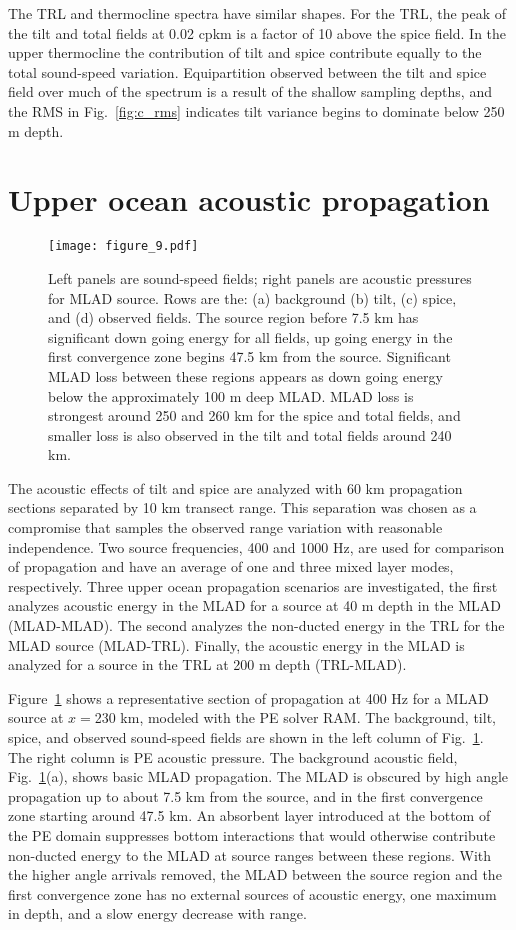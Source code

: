 \documentclass[preprint,NumberedRefs]{JASA}
\begin{document}
The TRL and thermocline spectra have similar shapes. For the TRL, the peak of the tilt and total fields at 0.02 cpkm is a factor of 10 above the spice field. In the upper thermocline the contribution of tilt and spice contribute equally to the total sound-speed variation. Equipartition observed between the tilt and spice field over much of the spectrum is a result of the shallow sampling depths, and the RMS in Fig.~\ref{fig:c_rms} indicates tilt variance begins to dominate below 250 m depth.

\section{\label{sec:propagation}Upper ocean acoustic propagation}
\begin{figure}
\texttt{[image: figure\_9.pdf]}
    \caption{\label{fig:decomp_x}{Left panels are sound-speed fields; right panels are acoustic pressures for MLAD source. Rows are the: (a) background (b) tilt, (c) spice, and (d) observed fields. The source region before 7.5 km has significant down going energy for all fields, up going energy in the first convergence zone begins 47.5 km from the source. Significant MLAD loss between these regions appears as down going energy below the approximately 100 m deep MLAD. MLAD loss is strongest around 250 and 260 km for the spice and total fields, and smaller loss is also observed in the tilt and total fields around 240 km.}}
\end{figure}

The acoustic effects of tilt and spice are analyzed with 60 km propagation sections separated by 10 km transect range. This separation was chosen as a compromise that samples the observed range variation with reasonable independence. Two source frequencies, 400 and 1000 Hz, are used for comparison of propagation and have an average of one and three mixed layer modes, respectively. Three upper ocean propagation scenarios are investigated, the first analyzes acoustic energy in the MLAD for a source at 40 m depth in the MLAD (MLAD-MLAD). The second analyzes the non-ducted energy in the TRL for the MLAD source (MLAD-TRL). Finally, the acoustic energy in the MLAD is analyzed for a source in the TRL at 200 m depth (TRL-MLAD).

Figure~\ref{fig:decomp_x} shows a representative section of propagation at 400 Hz for a MLAD source at $x=$230 km, modeled with the PE solver RAM.\citep{collins93} The background, tilt, spice, and observed sound-speed fields are shown in the left column of Fig.~\ref{fig:decomp_x}. The right column is PE acoustic pressure. The background acoustic field, Fig.~\ref{fig:decomp_x}(a), shows basic MLAD propagation. The MLAD is obscured by high angle propagation up to about 7.5 km from the source, and in the first convergence zone starting around 47.5 km. An absorbent layer introduced at the bottom of the PE domain suppresses bottom interactions that would otherwise contribute non-ducted energy to the MLAD at source ranges between these regions. With the higher angle arrivals removed, the MLAD between the source region and the first convergence zone has no external sources of acoustic energy, one maximum in depth, and a slow energy decrease with range.
\end{document}
